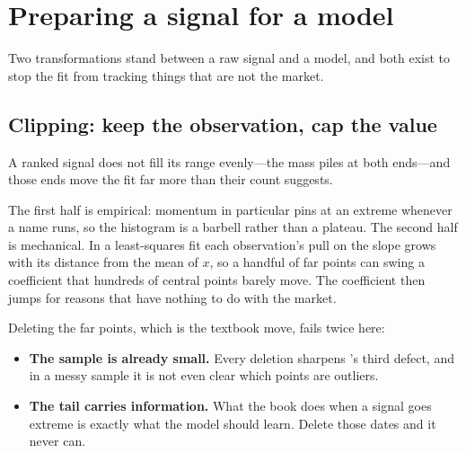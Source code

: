 \section{Preparing a signal for a model}\label{sec:preparing}

Two transformations stand between a raw signal and a model, and both exist to stop the fit from
tracking things that are not the market.

\subsection{Clipping: keep the observation, cap the value}\label{sec:clipping}

\begin{claim}\label{clm:barbell}
A ranked signal does not fill its range evenly---the mass piles at both ends---and those ends move
the fit far more than their count suggests.
\end{claim}

The first half is empirical: momentum in particular pins at an extreme whenever a name runs, so
the histogram is a barbell rather than a plateau. The second half is mechanical. In a
least-squares fit each observation's pull on the slope grows with its distance from the mean of
$x$, so a handful of far points can swing a coefficient that hundreds of central points barely
move. The coefficient then jumps for reasons that have nothing to do with the market.


Deleting the far points, which is the textbook move, fails twice here:

\begin{itemize}
  \item \textbf{The sample is already small.} Every deletion sharpens 's
        third defect, and in a messy sample it is not even clear which points are outliers.
  \item \textbf{The tail carries information.} What the book does when a signal goes extreme is
        exactly what the model should learn. Delete those dates and it never can.
\end{itemize}

